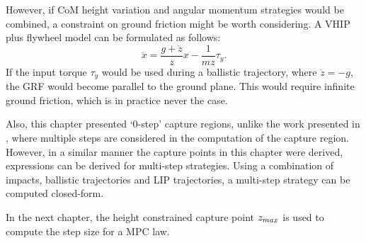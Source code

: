 However, if \ac{CoM} height variation and angular momentum strategies would be combined, a constraint on ground friction might be worth considering.  A \ac{VHIP} plus flywheel model can be formulated as follows:
\begin{equation}
 \ddot{x} = \frac{g+\ddot{z}}{z}x - \frac{1}{mz}\tau_y.
\end{equation}
If the input torque $\tau_y$ would be used during a ballistic trajectory, where $\ddot{z}=-g$, the \ac{GRF} would become parallel to the ground plane. This would require infinite ground friction, which is in practice never the case.

Also, this chapter presented `0-step' capture regions, unlike the work presented in \cite{koolen2012capturability, gao2017increase}, where multiple steps are considered in the computation of the capture region. However, in a similar manner the capture points in this chapter were derived, expressions can be derived for multi-step strategies. Using a combination of impacts, ballistic trajectories and \ac{LIP} trajectories, a multi-step strategy can be computed closed-form.

In the next chapter, the height constrained capture point $z_{max}$ is used to compute the step size for a \ac{MPC} law.